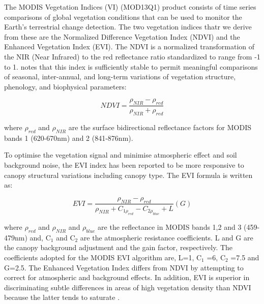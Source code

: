 The MODIS Vegetation Indices (VI) (MOD13Q1) product consists of time series comparisons of global vegetation conditions that can be used to monitor the Earth's terrestrial change detection. The two vegetation indices thatr we derive from these are the Normalized Difference Vegetation Index (NDVI) and the Enhanced Vegetation Index (EVI). The NDVI is a normalized transformation of the NIR (Near Infrared) to the red reflectance ratio standardized to range from -1 to 1.  \citet{ratana_huete_ferreira_2005} notes that this index is sufficiently stable to permit meaningful comparisons of seasonal, inter-annual, and long-term variations of vegetation structure, phenology, and biophysical parameters:


\begin{center}
\begin{equation}
NDVI = \frac{\rho_{NIR} - \rho_{red}}{\rho_{NIR} + \rho_{red}} \label{eq:1} 
\end{equation}
\end{center}

where $\rho_{red}$ and $\rho_{NIR}$ are the surface bidirectional reflectance factors for MODIS bands 1 (620-670nm) and 2 (841-876nm). 

To optimise the vegetation signal and minimise atmospheric effect and soil background noise, the EVI index has been reported to be more responsive to canopy structural variations including canopy type. The EVI formula is written as:

\begin{center}
\begin{equation}
EVI = \frac{\rho_{NIR} - \rho_{red}}{\rho_{NIR} + C_{1\rho_{red}} - C_{2\rho_{blue}} + L} (G) \label{eq:2} 
\end{equation}
\end{center}

where $\rho_{red}$ and $\rho_{NIR}$ and $\rho_{blue}$ are the reflectance in MODIS bands 1,2 and 3 (459-479nm) and, C$_{1}$ and C$_{2}$ are the atmospheric resistance coefficients. L and G are the canopy background adjustment and the gain factor, respectively. The coefficients adopted for the MODIS EVI algorithm are, L=1, C$_{1}$ =6, C$_{2}$ =7.5 and G=2.5. The Enhanced Vegetation Index differs from NDVI by attempting to correct for atmospheric and background effects. In addition, EVI is superior in discriminating subtle differences in areas of high vegetation density than NDVI because the latter tends to saturate \citep{didan_munoz_2015, ratana_huete_ferreira_2005}.



